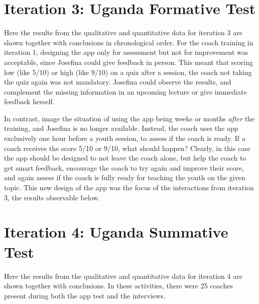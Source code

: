 \section{Iteration 3: Uganda Formative Test}

Here the results from the qualitative and quantitative data for iteration 3 are shown together with conclusions in chronological order. For the coach training in iteration 1, designing the app only for assessment but not for improvement was acceptable, since Josefina could give feedback in person. This meant that scoring low (like 5/10) or high (like 9/10) on a quiz after a session, the coach not taking the quiz again was not mandatory. Josefina could observe the results, and complement the missing information in an upcoming lecture or give immediate feedback herself.

In contrast, image the situation of using the app being weeks or months \textit{after} the training, and Josefina is no longer available. Instead, the coach uses the app exclusively one hour before a youth session, to assess if the coach is ready. If a coach receives the score 5/10 or 9/10, what should happen? Clearly, in this case the app should be designed to not leave the coach alone, but help the coach to get smart feedback, encourage the coach to try again and improve their score, and again assess if the coach is fully ready for teaching the youth on the given topic. This new design of the app was the focus of the interactions from iteration 3, the results observable below.






\section{Iteration 4: Uganda Summative Test}

Here the results from the qualitative and quantitative data for iteration 4 are shown together with conclusions. In these activities, there were 25 coaches present during both the app test and the interviews.




%


